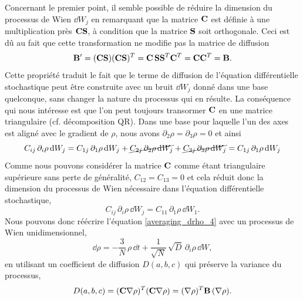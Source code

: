 \documentclass[openany,a4paper,12pt]{article}
\begin{document}
\par Concernant le premier point, il semble possible de réduire la dimension du processus de Wien $\dd W_j$ en remarquant que la matrice $\bold C$ est définie à une multiplication près $\bold C \bold S$, à condition que la matrice $\bold S$ soit orthogonale. Ceci est dû au fait que cette transformation ne modifie pas la matrice de diffusion 
%
\begin{equation}\label{invariance_B}
	\bold B' = (\bold C \bold S) (\bold C \bold S)^T = \bold C \, \bold S \bold S^T \bold C^T = \bold C \bold C^T = \bold B.
\end{equation}
%
Cette propriété traduit le fait que le terme de diffusion de l'équation différentielle stochastique peut être construite avec un bruit $\dd W_j$ donné dans une base quelconque, sans changer la nature du processus qui en résulte. %
La conséquence qui nous intéresse est que l'on peut toujours transormer $\bold C$ en une matrice triangulaire (cf. décomposition QR). Dans une base pour laquelle l'un des axes est aligné avec le gradient de $\rho$, nous avons $\partial_2\rho = \partial_3\rho = 0$ et ainsi
%
\begin{equation}\label{reduction_dW_1D_1}
	C_{ij} \, \partial_i\rho \, \dd W_j = 
	C_{1j} \, \partial_1\rho \, \dd W_j + 
	\cancel{ C_{2j} \, \partial_2\rho \, \dd W_j } + 
	\cancel{ C_{3j} \, \partial_3\rho \, \dd W_j }
	= C_{1j} \, \partial_1\rho \, \dd W_j
\end{equation}
%
Comme nous pouvons considérer la matrice $\bold C$ comme étant triangulaire supérieure sans perte de généralité, $C_{12} = C_{13} = 0$ et cela réduit donc la dimension du processus de Wien nécessaire dans l'équation différentielle stochastique,
%
\begin{equation}\label{reduction_dW_1D_2}
	C_{ij} \, \partial_i\rho \, \dd W_j = C_{11} \, \partial_1\rho \, \dd W_1.
\end{equation}
%
Nous pouvons donc réécrire l'équation \ref{averaging_drho_4} avec un processus de Wien unidimensionnel,
%
\begin{equation}\label{averaging_drho_5}
\dd \rho = -\frac 3N \, \rho \, \dd t + \frac{1}{\sqrt{N}}\, \sqrt{D} \, \partial_i\rho \, \dd W,
\end{equation}
%
en utilisant un coefficient de diffusion $D(a,b,c)$ qui préserve la variance du processus,
%
\begin{equation}\label{expr_D_abc_variance}
	D(a,b,c) = (\bold C \bold \nabla\rho)^T(\bold C \bold \nabla\rho) = (\bold \nabla\rho)^T \bold B \, (\bold \nabla\rho).
\end{equation}
%
\end{document}
